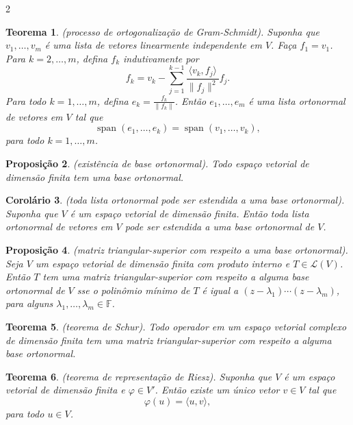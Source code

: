 \documentclass{article}
\theoremstyle{plain}
\newtheorem{thm}{Teorema}[section]
\newtheorem{prop}[thm]{Proposição}
\newtheorem{cor}[thm]{Corolário}
\theoremstyle{definition}
\theoremstyle{remark}
\DeclareMathOperator{\spn}{span}
\begin{document}
\begin{multicols}{2}
\begin{thm} (processo de ortogonalização de Gram-Schmidt).
    Suponha que \(v_1, \ldots, v_m\) é uma lista de vetores linearmente independente em \(V\). Faça \(f_1 = v_1\). Para \(k=2, \ldots, m\), defina \(f_k\) indutivamente por 
    \[
        f_k = v_k - \sum_{j=1}^{k-1} \frac{\langle v_k, f_j \rangle}{\|f_j\|^2} f_j.
    \]
    \noindent Para todo \(k = 1, \ldots, m\), defina \(e_k = \frac{f_k}{\|f_k\|}\). Então \(e_1, \ldots, e_m\) é uma lista ortonormal de vetores em \(V\) tal que
    \[
        \spn(e_1, \ldots, e_k) = \spn(v_1, \ldots, v_k),
    \]
    \noindent para todo \(k = 1, \ldots, m\).
\end{thm}

\begin{prop} (existência de base ortonormal).
    Todo espaço vetorial de dimensão finita tem uma base ortonormal.
\end{prop}

\begin{cor} (toda lista ortonormal pode ser estendida a uma base ortonormal).
    Suponha que \(V\) é um espaço vetorial de dimensão finita. Então toda lista ortonormal de vetores em \(V\) pode ser estendida a uma base ortonormal de \(V\).
\end{cor}

\begin{prop} (matriz triangular-superior com respeito a uma base ortonormal).
    Seja \(V\) um espaço vetorial de dimensão finita com produto interno e \(T \in \mathcal{L}(V)\). Então \(T\) tem uma matriz triangular-superior com respeito a alguma base ortonormal de \(V\) sse o polinômio mínimo de \(T\) é igual a \((z - \lambda_1) \cdots (z - \lambda_m)\), para alguns \(\lambda_1, \ldots, \lambda_m \in \mathbb{F}\).
\end{prop}

\begin{thm} (teorema de Schur).
    Todo operador em um espaço vetorial complexo de dimensão finita tem uma matriz triangular-superior com respeito a alguma base ortonormal.
\end{thm}

\begin{thm} (teorema de representação de Riesz).
    Suponha que \(V\) é um espaço vetorial de dimensão finita e \(\varphi \in V'\). Então existe um único vetor \(v \in V\) tal que
    \[
        \varphi(u) = \langle u, v \rangle,
    \]
    para todo \(u \in V\).
\end{thm}


\end{multicols}
\end{document}
